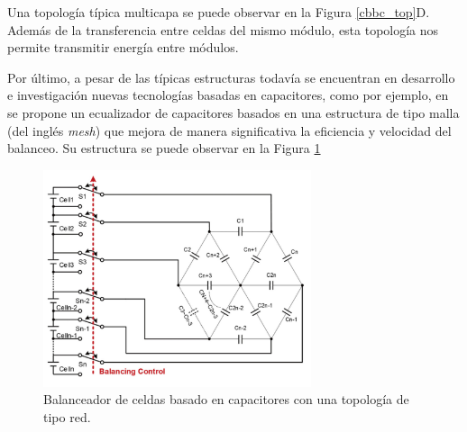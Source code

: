 \documentclass[10pt,a4paper]{article}
\begin{document}
Una topolog\'ia t\'ipica multicapa se puede observar en la Figura
\ref{cbbc_top}D. Adem\'as de la transferencia entre celdas del mismo m\'odulo,
esta topolog\'ia nos permite transmitir energ\'ia entre m\'odulos. 

Por \'ultimo, a pesar de las t\'ipicas estructuras todav\'ia se encuentran
en desarrollo e investigaci\'on nuevas tecnolog\'ias basadas en capacitores,
como por ejemplo, en \cite{shang_et_al_bal_cap} se propone un ecualizador de 
capacitores basados en una estructura de tipo malla (del ingl\'es \emph{mesh}) 
que mejora de manera significativa la eficiencia y velocidad del balanceo. 
Su estructura se puede observar en la Figura \ref{cbbc_mesh_top}

\begin{figure}[h!]
    \begin{center}
        \includegraphics[width=0.7\textwidth]{cbbc_mesh_top.png}
        \caption{Balanceador de celdas basado en capacitores con una topolog\'ia
        de tipo red.}
        \label{cbbc_mesh_top}
    \end{center}
\end{figure}
\end{document}

